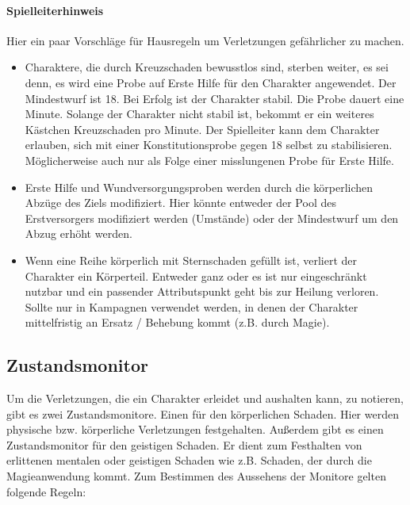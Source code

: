 \documentclass{article}
\begin{document}
\begin{mdframed}[hidealllines=true, backgroundcolor=black!10]
\paragraph{Spielleiterhinweis}

Hier ein paar Vorschläge für Hausregeln um Verletzungen gefährlicher zu machen.

\begin{itemize}
\item Charaktere, die durch Kreuzschaden bewusstlos sind, sterben weiter, es sei denn, es wird eine Probe auf Erste Hilfe für den Charakter angewendet. Der Mindestwurf ist 18. Bei Erfolg ist der Charakter stabil. Die Probe dauert eine Minute. Solange der Charakter nicht stabil ist, bekommt er ein weiteres Kästchen Kreuzschaden pro Minute. Der Spielleiter kann dem Charakter erlauben, sich mit einer Konstitutionsprobe gegen 18 selbst zu stabilisieren. Möglicherweise auch nur als Folge einer misslungenen Probe für Erste Hilfe.
\item Erste Hilfe und Wundversorgungsproben werden durch die körperlichen Abzüge des Ziels modifiziert. Hier könnte entweder der Pool des Erstversorgers modifiziert werden (Umstände) oder der Mindestwurf um den Abzug erhöht werden.
\item Wenn eine Reihe körperlich mit Sternschaden gefüllt ist, verliert der Charakter ein Körperteil. Entweder ganz oder es ist nur eingeschränkt nutzbar und ein passender Attributspunkt geht bis zur Heilung verloren. Sollte nur in Kampagnen verwendet werden, in denen der Charakter mittelfristig an Ersatz / Behebung kommt (z.B. durch Magie).
\end{itemize}

\end{mdframed}
\begin{center}
\subsection{Zustandsmonitor}
\end{center}

Um die Verletzungen, die ein Charakter erleidet und aushalten kann, zu notieren, gibt es zwei Zustandsmonitore. Einen
für den körperlichen Schaden. Hier werden physische bzw. körperliche Verletzungen festgehalten. Außerdem gibt es einen
Zustandsmonitor für den geistigen Schaden. Er dient zum Festhalten von erlittenen mentalen oder geistigen Schaden wie
z.B. Schaden, der durch die Magieanwendung kommt. Zum Bestimmen des Aussehens der Monitore gelten folgende Regeln:
\end{document}
